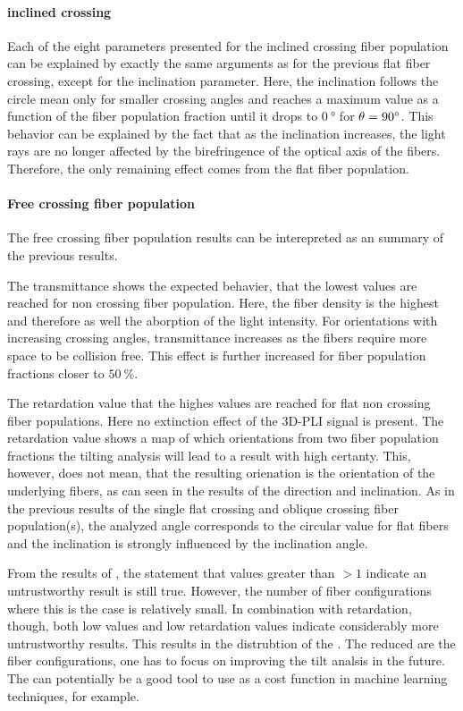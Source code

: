 \paragraph{inclined crossing}
Each of the eight parameters presented for the inclined crossing fiber population can be explained by exactly the same arguments as for the previous flat fiber crossing, except for the inclination parameter.
Here, the inclination follows the circle mean only for smaller crossing angles and reaches a maximum value as a function of the fiber population fraction \modelPsi{} until it drops to $\SI{0}{\degree}$ for $\textnormal{$\theta$} = \SI{90}{\degree}$.
This behavior can be explained by the fact that as the inclination increases, the light rays are no longer affected by the birefringence of the optical axis of the fibers.
Therefore, the only remaining effect comes from the flat fiber population.
% 
\paragraph{Free crossing fiber population}
The free crossing fiber population results can be interepreted as an summary of the previous results.
\par
% 
The transmittance shows the expected behavier, that the lowest values are reached for non crossing fiber population.
Here, the fiber density is the highest and therefore as well the aborption of the light intensity.
For orientations with increasing crossing angles, transmittance increases as the fibers require more space to be collision free.
This effect is further increased for fiber population fractions closer to $\SI{50}{\percent}$.
\par
% 
The retardation value that the highes values are reached for flat non crossing fiber populations.
Here no extinction effect of the \ac{3D-PLI} signal is present.
The retardation value shows a map of which orientations from two fiber population fractions the tilting analysis will lead to a result with high certanty.
This, however, does not mean, that the resulting orienation is the orientation of the underlying fibers, as can seen in the results of the direction and inclination.
As in the previous results of the single flat crossing and oblique crossing fiber population(s), the analyzed angle corresponds to the circular value for flat fibers and the inclination is strongly influenced by the inclination angle.
\par
% 
From the results of \trel{}, the statement that \trel{} values greater than $>1$ indicate an untrustworthy result is still true.
However, the number of fiber configurations where this is the case is relatively small.
In combination with retardation, though, both low \trel{} values and low retardation values indicate considerably more untrustworthy results.
This results in the distrubtion of the \accvalue{}.
The reduced \accvalue{} are the fiber configurations, one has to focus on improving the tilt analsis in the future.
The \accvalue{} can potentially be a good tool to use as a cost function in machine learning techniques, for example.
%
%
%

